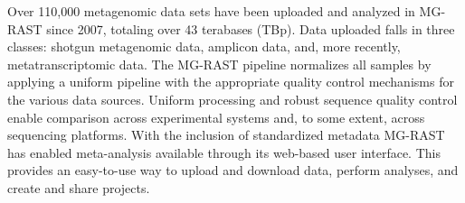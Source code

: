 


Over 110,000 metagenomic data sets have been uploaded and analyzed in MG-RAST since 2007, totaling over 43 terabases (TBp). Data uploaded falls in three classes: shotgun metagenomic data, amplicon data, and, more recently, metatranscriptomic data. The MG-RAST pipeline normalizes all samples by applying a uniform pipeline with the appropriate quality control mechanisms for the various data sources. Uniform processing and robust sequence quality control enable comparison across experimental systems and, to some extent, across sequencing platforms. With the inclusion of standardized metadata MG-RAST has enabled meta-analysis available through its web-based user interface. This provides an easy-to-use way to upload and download data, perform analyses, and create and share projects.

